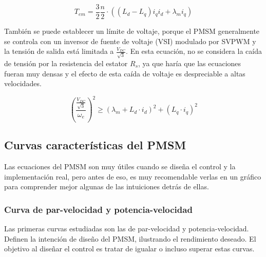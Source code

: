 \begin{equation}
T_{em} = \frac{3}{2}\frac{n}{2}\cdot((L_d - L_q) i_q i_d + \lambda_m i_q)
\end{equation}

También se puede establecer un límite de voltaje, porque el PMSM generalmente se controla con un inversor de fuente de voltaje (VSI) modulado por SVPWM y la tensión de salida está limitada a \(\frac{V_{DC}}{\sqrt{3}}\). En esta ecuación, no se considera la caída de tensión por la resistencia del estator \(R_s\), ya que haría que las ecuaciones fueran muy densas y el efecto de esta caída de voltaje es despreciable a altas velocidades.

\begin{equation}
\left(\frac{\frac{V_{DC}}{\sqrt{3}}}{\omega_e}\right)^2 \geq \left(\lambda_m+L_d\cdot i_d\right)^2+(L_q\cdot i_q)^2
\end{equation}

\subsection{Curvas características del PMSM}

Las ecuaciones del PMSM son muy útiles cuando se diseña el control y la implementación real, pero antes de eso, es muy recomendable verlas en un gráfico para comprender mejor algunas de las intuiciones detrás de ellas.

\subsubsection{Curva de par-velocidad y potencia-velocidad}

Las primeras curvas estudiadas son las de par-velocidad y potencia-velocidad. Definen la intención de diseño del PMSM, ilustrando el rendimiento deseado. El objetivo al diseñar el control es tratar de igualar o incluso superar estas curvas.


